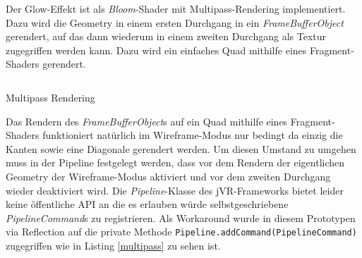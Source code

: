 \documentclass[a4paper]{article}
\begin{document}
Der Glow-Effekt ist als \textit{Bloom}-Shader mit Multipass-Rendering implementiert. Dazu wird die Geometry in einem ersten Durchgang in ein \textit{FrameBufferObject} gerendert, auf das dann wiederum in einem zweiten Durchgang als Textur zugegriffen werden kann. Dazu wird ein einfaches Quad mithilfe eines Fragment-Shaders gerendert.

\begin{listing}[H]
\inputminted[firstline=34, lastline=53]{scala}{../scala/org/whiskeysierra/powpow/PowPow.scala}
\caption{Multipass Rendering}
\label{multipass}
\end{listing}

Das Rendern des \textit{FrameBufferObject}s auf ein Quad mithilfe eines Fragment-Shaders funktioniert natürlich im Wireframe-Modus nur bedingt da einzig die Kanten sowie eine Diagonale gerendert werden. Um diesen Umstand zu umgehen muss in der Pipeline festgelegt werden, dass vor dem Rendern der eigentlichen Geometry der Wireframe-Modus aktiviert und vor dem zweiten Durchgang wieder deaktiviert wird. Die \textit{Pipeline}-Klasse des jVR-Frameworks bietet leider keine öffentliche API an die es erlauben würde selbstgeschriebene \textit{PipelineCommand}s zu registrieren. Als Workaround wurde in diesem Prototypen via Reflection auf die private Methode \texttt{Pipeline.addCommand(PipelineCommand)} zugegriffen wie in Listing \ref{multipass} zu sehen ist.

\newpage
\nocite{pewpewgame}
\nocite{jinput}
\nocite{scala}
\nocite{jbullet}
\nocite{BaileyCunningham200905}
\printbibliography

\listoffigures

\renewcommand\listoflistingscaption{Quellcodeverzeichnis}
\listoflistings
\end{document}
